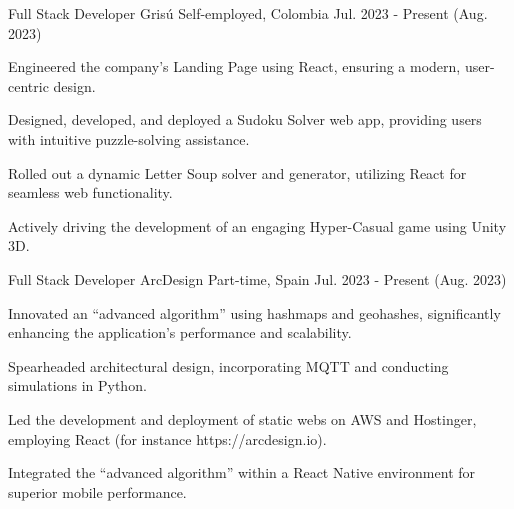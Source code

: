 \newcommand{\quotes}[1]{``#1''}

\begin{cventries}

  \cventry
  {Full Stack Developer} %
  {Grisú} %
  {Self-employed, Colombia} %
  {Jul. 2023 - Present (Aug. 2023)} %
  {
    \begin{cvitems} %
      \item {Engineered the company's Landing Page using React, ensuring a modern, user-centric design.}
      \item {Designed, developed, and deployed a Sudoku Solver web app, providing users with intuitive puzzle-solving assistance.}
      \item {Rolled out a dynamic Letter Soup solver and generator, utilizing React for seamless web functionality.}
      \item {Actively driving the development of an engaging Hyper-Casual game using Unity 3D.}
    \end{cvitems}
  }

  \cventry
  {Full Stack Developer} %
  {ArcDesign} %
  {Part-time, Spain} %
  {Jul. 2023 - Present (Aug. 2023)} %
  {
    \begin{cvitems} %
      \item {Innovated an \quotes{advanced algorithm} using hashmaps and geohashes, significantly enhancing the application's performance and scalability.}
      \item {Spearheaded architectural design, incorporating MQTT and conducting simulations in Python.}
      \item {Led the development and deployment of static webs on AWS and Hostinger, employing React (for instance https://arcdesign.io).}
      \item {Integrated the \quotes{advanced algorithm} within a React Native environment for superior mobile performance.}
    \end{cvitems}
  }


\end{cventries}
